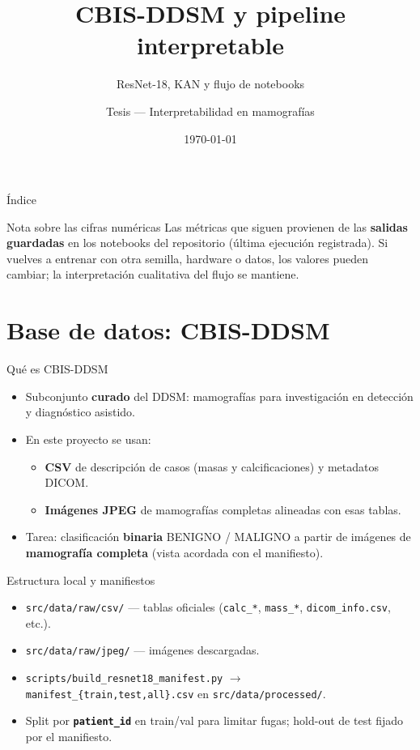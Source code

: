 \documentclass[aspectratio=169,spanish]{beamer}
\title{CBIS-DDSM y pipeline interpretable}
\subtitle{ResNet-18, KAN y flujo de notebooks}
\author{Tesis — Interpretabilidad en mamografías}
\date{\today}
\begin{document}
\begin{frame}
  \titlepage
\end{frame}

\begin{frame}{Índice}
  \tableofcontents
\end{frame}

\begin{frame}{Nota sobre las cifras numéricas}
  \small
  Las métricas que siguen provienen de las \textbf{salidas guardadas} en los notebooks del repositorio (última ejecución registrada). Si vuelves a entrenar con otra semilla, hardware o datos, los valores pueden cambiar; la interpretación cualitativa del flujo se mantiene.
\end{frame}

\section{Base de datos: CBIS-DDSM}

\begin{frame}{Qué es CBIS-DDSM}
  \begin{itemize}
    \item Subconjunto \textbf{curado} del DDSM: mamografías para investigación en detección y diagnóstico asistido.
    \item En este proyecto se usan:
      \begin{itemize}
        \item \textbf{CSV} de descripción de casos (masas y calcificaciones) y metadatos DICOM.
        \item \textbf{Imágenes JPEG} de mamografías completas alineadas con esas tablas.
      \end{itemize}
    \item Tarea: clasificación \textbf{binaria} BENIGNO / MALIGNO a partir de imágenes de \textbf{mamografía completa} (vista acordada con el manifiesto).
  \end{itemize}
\end{frame}

\begin{frame}{Estructura local y manifiestos}
  \begin{itemize}
    \item \texttt{src/data/raw/csv/} — tablas oficiales (\texttt{calc\_*}, \texttt{mass\_*}, \texttt{dicom\_info.csv}, etc.).
    \item \texttt{src/data/raw/jpeg/} — imágenes descargadas.
    \item \texttt{scripts/build\_resnet18\_manifest.py} $\rightarrow$ \texttt{manifest\_\{train,test,all\}.csv} en \texttt{src/data/processed/}.
    \item Split por \textbf{\texttt{patient\_id}} en train/val para limitar fugas; hold-out de test fijado por el manifiesto.
  \end{itemize}
\end{frame}
\end{document}
